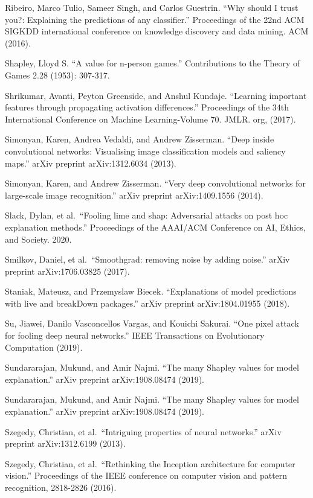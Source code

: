 \documentclass[
  12pt,
]{krantz}
\begin{document}
Ribeiro, Marco Tulio, Sameer Singh, and Carlos Guestrin. ``Why should I trust you?: Explaining the predictions of any classifier.'' Proceedings of the 22nd ACM SIGKDD international conference on knowledge discovery and data mining. ACM (2016).

Shapley, Lloyd S. ``A value for n-person games.'' Contributions to the Theory of Games 2.28 (1953): 307-317.

Shrikumar, Avanti, Peyton Greenside, and Anshul Kundaje. ``Learning important features through propagating activation differences.'' Proceedings of the 34th International Conference on Machine Learning-Volume 70. JMLR. org, (2017).

Simonyan, Karen, Andrea Vedaldi, and Andrew Zisserman. ``Deep inside convolutional networks: Visualising image classification models and saliency maps.'' arXiv preprint arXiv:1312.6034 (2013).

Simonyan, Karen, and Andrew Zisserman. ``Very deep convolutional networks for large-scale image recognition.'' arXiv preprint arXiv:1409.1556 (2014).

Slack, Dylan, et al.~``Fooling lime and shap: Adversarial attacks on post hoc explanation methods.'' Proceedings of the AAAI/ACM Conference on AI, Ethics, and Society. 2020.

Smilkov, Daniel, et al.~``Smoothgrad: removing noise by adding noise.'' arXiv preprint arXiv:1706.03825 (2017).

Staniak, Mateusz, and Przemyslaw Biecek. ``Explanations of model predictions with live and breakDown packages.'' arXiv preprint arXiv:1804.01955 (2018).

Su, Jiawei, Danilo Vasconcellos Vargas, and Kouichi Sakurai. ``One pixel attack for fooling deep neural networks.'' IEEE Transactions on Evolutionary Computation (2019).

Sundararajan, Mukund, and Amir Najmi. ``The many Shapley values for model explanation.'' arXiv preprint arXiv:1908.08474 (2019).

Sundararajan, Mukund, and Amir Najmi. ``The many Shapley values for model explanation.'' arXiv preprint arXiv:1908.08474 (2019).

Szegedy, Christian, et al.~``Intriguing properties of neural networks.'' arXiv preprint arXiv:1312.6199 (2013).

Szegedy, Christian, et al.~``Rethinking the Inception architecture for computer vision.'' Proceedings of the IEEE conference on computer vision and pattern recognition, 2818-2826 (2016).
\end{document}
